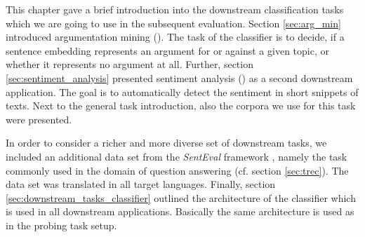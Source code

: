 This chapter gave a brief introduction into the downstream classification tasks which we are going to use in the subsequent evaluation. Section \vref{sec:arg_min} introduced argumentation mining (). The task of the classifier is to decide, if a sentence embedding represents an argument for or against a given topic, or whether it represents no argument at all. Further, section \vref{sec:sentiment_analysis} presented sentiment analysis () as a second downstream application. The goal is to automatically detect the sentiment in short snippets of texts. Next to the general task introduction, also the corpora we use for this task were presented.

In order to consider a richer and more diverse set of downstream tasks, we included an additional data set from the \textit{SentEval} framework \citep{Conneau.2018b}, namely the  task commonly used in the domain of question answering (cf. section \vref{sec:trec}). The data set was translated in all target languages. Finally, section \vref{sec:downstream_tasks_classifier} outlined the architecture of the classifier which is used in all downstream applications. Basically the same architecture is used as in the probing task setup.